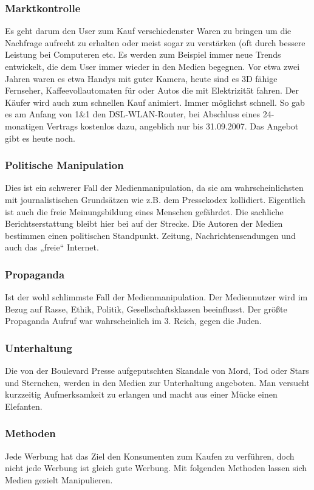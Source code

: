 \subsubsection{Marktkontrolle}
Es geht darum den User zum Kauf verschiedenster Waren zu bringen um die Nachfrage aufrecht zu
erhalten oder meist sogar zu verstärken (oft durch bessere Leistung bei Computeren etc.
Es werden zum Beispiel immer neue Trends entwickelt, die dem User immer wieder in den  Medien
begegnen. Vor etwa zwei Jahren waren es etwa Handys mit guter Kamera, heute sind es 3D fähige
Fernseher, Kaffeevollautomaten für  oder Autos die mit Elektrizität fahren.
Der Käufer wird auch zum schnellen Kauf animiert. Immer möglichst schnell. So gab es am Anfang von
1\&1 den DSL-WLAN-Router, bei Abschluss eines 24-monatigen Vertrags kostenlos dazu, angeblich nur bis
31.09.2007. Das Angebot gibt es heute noch.

\subsubsection{Politische Manipulation}
Dies ist ein schwerer Fall der Medienmanipulation, da sie am wahrscheinlichsten mit journalistischen
Grundsätzen wie z.B. dem Pressekodex kollidiert. Eigentlich ist auch die freie Meinungsbildung eines
Menschen gefährdet. Die sachliche Berichtserstattung bleibt hier bei auf der Strecke. Die Autoren der
Medien bestimmen einen politischen Standpunkt. Zeitung, Nachrichtensendungen und auch das „freie“
Internet.

\subsubsection{Propaganda}
Ist der wohl schlimmste Fall der Medienmanipulation. Der Mediennutzer wird im Bezug auf Rasse, Ethik,
Politik, Gesellschaftsklassen beeinflusst. Der größte Propaganda Aufruf war wahrscheinlich im 3.
Reich, gegen die Juden.

\subsubsection{Unterhaltung}
Die von der Boulevard Presse aufgeputschten Skandale von Mord, Tod oder Stars und Sternchen, werden
in den Medien zur Unterhaltung angeboten. Man versucht kurzzeitig Aufmerksamkeit zu erlangen und
macht aus einer Mücke einen Elefanten.

\subsubsection{Methoden}
Jede Werbung hat das Ziel den Konsumenten zum Kaufen zu verführen, doch nicht jede Werbung ist gleich
gute Werbung. Mit folgenden Methoden lassen sich Medien gezielt Manipulieren.

